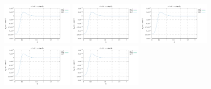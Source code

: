 \noindent
\includegraphics[width=3.5cm]{python_codes/fieldstone_152/RESULTS/exp3/err_32_m2}
\includegraphics[width=3.5cm]{python_codes/fieldstone_152/RESULTS/exp3/err_32_m3}
\includegraphics[width=3.5cm]{python_codes/fieldstone_152/RESULTS/exp3/err_32_m4}
\includegraphics[width=3.5cm]{python_codes/fieldstone_152/RESULTS/exp3/err_32_m5}
\includegraphics[width=3.5cm]{python_codes/fieldstone_152/RESULTS/exp3/err_32_m6}

